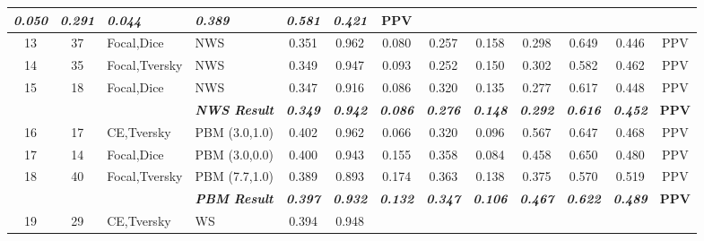 \begin{table}[H]
{\begin{tabular}{ccl|l|c|c|c|c|c|c|c|c|c|}
    \textit{\textbf{0.050}} &
    \textit{\textbf{0.291}} &
    \textit{\textbf{0.044}} &
    \textit{\textbf{0.389}} &
    \textit{\textbf{0.581}} &
    \textit{\textbf{0.421}} &
    \textbf{PPV} \\ \hline
  \multicolumn{1}{|c|}{13} &
    \multicolumn{1}{c|}{37} &
    Focal,Dice &
    NWS &
    0.351 &
    0.962 &
    0.080 &
    0.257 &
    0.158 &
    0.298 &
    0.649 &
    0.446 &
    PPV \\ \hline
  \multicolumn{1}{|c|}{14} &
    \multicolumn{1}{c|}{35} &
    Focal,Tversky &
    NWS &
    0.349 &
    0.947 &
    0.093 &
    0.252 &
    0.150 &
    0.302 &
    0.582 &
    0.462 &
    PPV \\ \hline
  \multicolumn{1}{|c|}{15} &
    \multicolumn{1}{c|}{18} &
    Focal,Dice &
    NWS &
    0.347 &
    0.916 &
    0.086 &
    0.320 &
    0.135 &
    0.277 &
    0.617 &
    0.448 &
    PPV \\ \hline
  \textbf{} &
    \textbf{} &
    \textbf{} &
    \textit{\textbf{NWS Result}} &
    \textit{\textbf{0.349}} &
    \textit{\textbf{0.942}} &
    \textit{\textbf{0.086}} &
    \textit{\textbf{0.276}} &
    \textit{\textbf{0.148}} &
    \textit{\textbf{0.292}} &
    \textit{\textbf{0.616}} &
    \textit{\textbf{0.452}} &
    \textbf{PPV} \\ \hline
  \multicolumn{1}{|c|}{16} &
    \multicolumn{1}{c|}{17} &
    CE,Tversky &
    PBM (3.0,1.0) &
    0.402 &
    0.962 &
    0.066 &
    0.320 &
    0.096 &
    0.567 &
    0.647 &
    0.468 &
    PPV \\ \hline
  \multicolumn{1}{|c|}{17} &
    \multicolumn{1}{c|}{14} &
    Focal,Dice &
    PBM (3.0,0.0) &
    0.400 &
    0.943 &
    0.155 &
    0.358 &
    0.084 &
    0.458 &
    0.650 &
    0.480 &
    PPV \\ \hline
  \multicolumn{1}{|c|}{18} &
    \multicolumn{1}{c|}{40} &
    Focal,Tversky &
    PBM (7.7,1.0) &
    0.389 &
    0.893 &
    0.174 &
    0.363 &
    0.138 &
    0.375 &
    0.570 &
    0.519 &
    PPV \\ \hline
  \textbf{} &
    \textbf{} &
    \textbf{} &
    \textit{\textbf{PBM Result}} &
    \textit{\textbf{0.397}} &
    \textit{\textbf{0.932}} &
    \textit{\textbf{0.132}} &
    \textit{\textbf{0.347}} &
    \textit{\textbf{0.106}} &
    \textit{\textbf{0.467}} &
    \textit{\textbf{0.622}} &
    \textit{\textbf{0.489}} &
    \textbf{PPV} \\ \hline
  \multicolumn{1}{|c|}{19} &
    \multicolumn{1}{c|}{29} &
    CE,Tversky &
    WS &
    0.394 &
    0.948 &

\end{tabular}}
\end{table}
